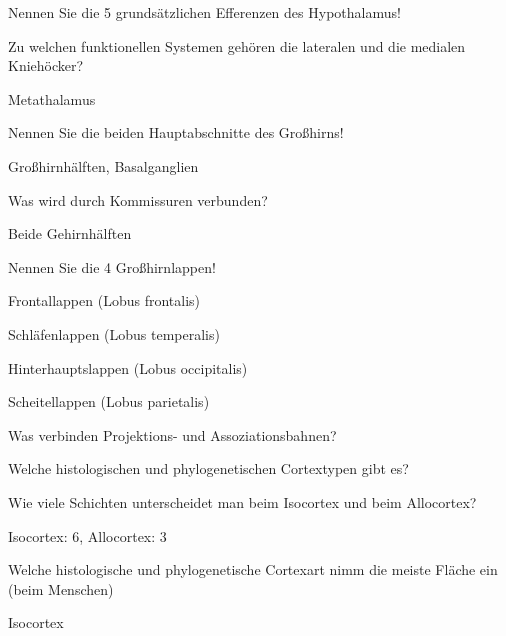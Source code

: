 \documentclass[10pt, a4paper]{exam}
\begin{document}
\begin{questions}
  \question Nennen Sie die 5 grundsätzlichen Efferenzen des Hypothalamus!
  \begin{solution}

  \end{solution}

  \question Zu welchen funktionellen Systemen gehören die lateralen und die medialen Kniehöcker?
  \begin{solution}
    Metathalamus
  \end{solution}

  \question Nennen Sie die beiden Hauptabschnitte des Großhirns!
  \begin{solution}
    Großhirnhälften, Basalganglien
  \end{solution}

  \question Was wird durch Kommissuren verbunden?
  \begin{solution}
    Beide Gehirnhälften
  \end{solution}

  \question Nennen Sie die 4 Großhirnlappen!
  \begin{solution}
    \begin{itemize*}
      \item Frontallappen (Lobus frontalis)
      \item Schläfenlappen (Lobus temperalis)
      \item Hinterhauptslappen (Lobus occipitalis)
      \item Scheitellappen (Lobus parietalis)
    \end{itemize*}
  \end{solution}

  \question Was verbinden Projektions- und Assoziationsbahnen?
  \begin{solution}

  \end{solution}

  \question Welche histologischen und phylogenetischen Cortextypen gibt es?
  \begin{solution}

  \end{solution}

  \question Wie viele Schichten unterscheidet man beim Isocortex und beim Allocortex?
  \begin{solution}
    Isocortex: 6, Allocortex: 3
  \end{solution}

  \question Welche histologische und phylogenetische Cortexart nimm die meiste Fläche ein (beim Menschen)
  \begin{solution}
    Isocortex
  \end{solution}


\end{questions}
\end{document}
